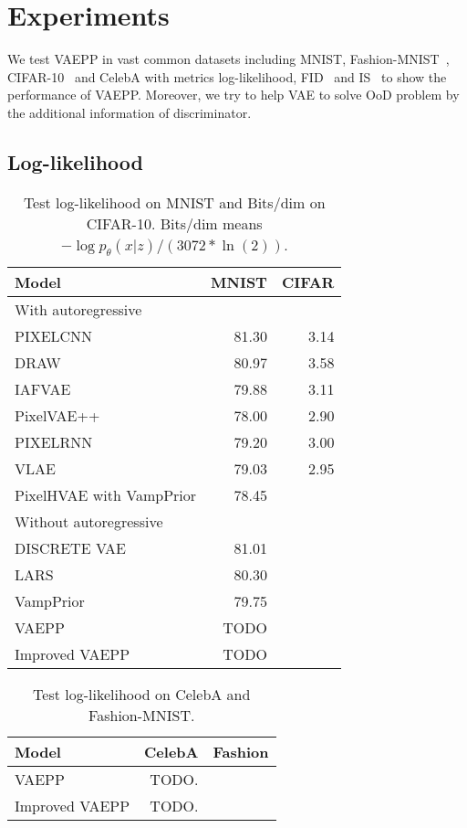 \section{Experiments}
We test VAEPP in vast common datasets including MNIST, Fashion-MNIST~\cite{xiao2017/online}, CIFAR-10~\cite{krizhevsky2009learning} and CelebA with metrics log-likelihood, FID~\cite{heusel2017gans} and IS~\cite{salimans2016improved} to show the performance of VAEPP. Moreover, we try to help VAE to solve OoD problem by the additional information of discriminator. 
\subsection{Log-likelihood}

\begin{table}[tb]
\centering
\begin{tabular}{lrr}  
\toprule
Model  &  MNIST & CIFAR\\
\midrule
With autoregressive   \\
PIXELCNN         &  81.30  &  3.14   \\
DRAW             &  80.97  &  3.58    \\
IAFVAE           &  79.88  &  3.11    \\
PixelVAE++       &  78.00  &  2.90   \\
PIXELRNN         &  79.20  &  3.00    \\
VLAE             &  79.03  &  2.95     \\
PixelHVAE with VampPrior &  78.45  &     \\
\midrule
Without autoregressive   \\
DISCRETE VAE     &  81.01      \\
LARS             &  80.30     \\
VampPrior        &  79.75      \\
VAEPP            &  TODO      \\
Improved VAEPP   &  TODO      \\
\bottomrule
\end{tabular}
\caption{Test log-likelihood on MNIST and Bits/dim on CIFAR-10. Bits/dim means $-\log p_\theta(x|z) / (3072 * \ln(2))$.}
\label{tab:mnist-nll}
\end{table}

\begin{table}[tb]
\centering
\begin{tabular}{lrr}  
\toprule
Model  &  CelebA & Fashion \\
\midrule
VAEPP           &  TODO.     \\
Improved VAEPP   &  TODO.     \\
\bottomrule
\end{tabular}
\caption{Test log-likelihood on CelebA and Fashion-MNIST. }
\label{tab:cifar-nll}
\end{table}

